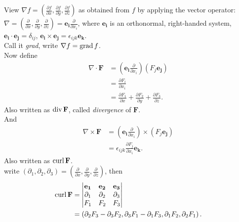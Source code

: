 \documentclass[a4paper]{article}
\begin{document}
View $\nabla f=\left(\frac{\partial f}{\partial x},\frac{\partial f}{\partial y},\frac{\partial f}{\partial z}\right)$ as obtained from $f$ by applying the vector operator:\\
$\nabla = \left(\frac{\partial}{\partial x},\frac{\partial}{\partial y},\frac{\partial}{\partial z}\right) = \mathbf{e_{i}} \frac{\partial}{\partial x_{i}}$,
where $\mathbf{e_{i}}$ is an orthonormal, right-handed system,
$\mathbf{e_{i}}\cdot \mathbf{e_{j}} = \delta_{ij}$, $\mathbf{e_{i}}\times \mathbf{e_{j}} = \epsilon_{ijk} \mathbf{e_{k}}$.\\
Call it \emph{grad}, write $\nabla f = \operatorname{grad} f$.\\
Now define
\begin{equation*}
\begin{aligned}
\nabla \cdot \mathbf{F} &= \left(\mathbf{e_{i}}\frac{\partial}{\partial x_{i}}\right)\left(F_{j} \mathbf{e_{j}}\right)\\
&= \frac{\partial F_{i}}{\partial x_{i}}\\
&= \frac{\partial F_1}{\partial x} + \frac{\partial F_2}{\partial y} + \frac{\partial F_3}{\partial z}.
\end{aligned}
\end{equation*}
Also written as $\operatorname{div} \mathbf{F}$, called \emph{divergence} of $\mathbf{F}$.\\
And\\
\begin{equation*}
\begin{aligned}
\nabla \times\mathbf{F} &= \left(\mathbf{e_{i}}\frac{\partial}{\partial x_{i}}\right)\times\left(F_j\mathbf{e_{j}}\right)\\
&= \epsilon_{ijk} \frac{\partial F_j}{\partial x_i}\mathbf{e_k}.
\end{aligned}
\end{equation*}
Also written as $\operatorname{curl} \mathbf{F}$.\\
write $\left(\partial_1,\partial_2,\partial_3\right)=\left(\frac{\partial}{\partial x},\frac{\partial}{\partial y},\frac{\partial}{\partial z}\right)$, then
\begin{equation*}
\begin{aligned}
\operatorname{curl} \mathbf{F} &=
\begin{vmatrix}
\mathbf{e_1}& \mathbf{e_2}& \mathbf{e_3}\\
\partial_1& \partial_2& \partial_3\\
F_1& F_2& F_3
\end{vmatrix}\\
&=\left(\partial_2 F_3-\partial_3 F_2,\partial_3 F_1-\partial_1 F_3,\partial_1 F_2,\partial_2 F_1\right).
\end{aligned}
\end{equation*}
\end{document}
